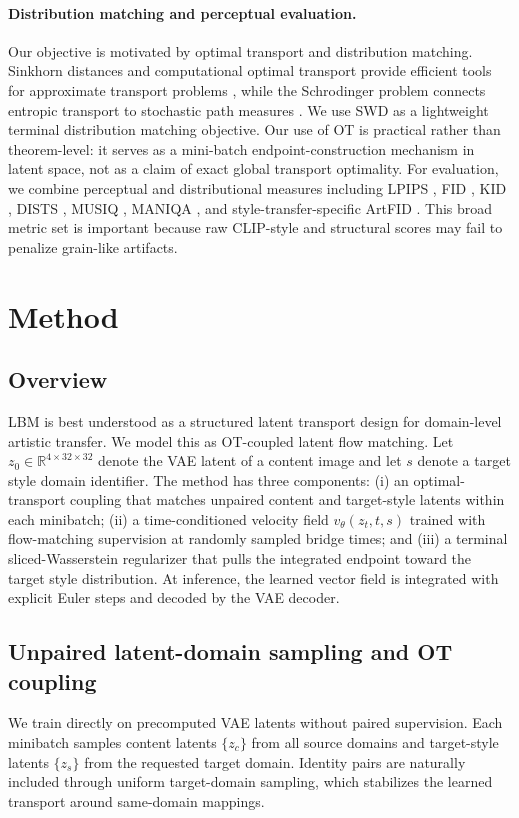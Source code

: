 ﻿\documentclass[letterpaper]{article}
\begin{document}
\paragraph{Distribution matching and perceptual evaluation.}
Our objective is motivated by optimal transport and distribution matching. Sinkhorn distances and computational optimal transport provide efficient tools for approximate transport problems \cite{cuturi2013sinkhorn,peyre2019computational}, while the Schrodinger problem connects entropic transport to stochastic path measures \cite{leonard2014survey}. We use SWD as a lightweight terminal distribution matching objective. Our use of OT is practical rather than theorem-level: it serves as a mini-batch endpoint-construction mechanism in latent space, not as a claim of exact global transport optimality. For evaluation, we combine perceptual and distributional measures including LPIPS \cite{zhang2018lpips}, FID \cite{heusel2017fid}, KID \cite{binkowski2018kid}, DISTS \cite{ding2020dists}, MUSIQ \cite{ke2021musiq}, MANIQA \cite{yang2022maniqa}, and style-transfer-specific ArtFID \cite{wright2022artfid}. This broad metric set is important because raw CLIP-style and structural scores may fail to penalize grain-like artifacts.

\section{Method}
\subsection{Overview}
LBM is best understood as a structured latent transport design for domain-level artistic transfer. We model this as OT-coupled latent flow matching. Let $z_0 \in \mathbb{R}^{4 \times 32 \times 32}$ denote the VAE latent of a content image and let $s$ denote a target style domain identifier. The method has three components: (i) an optimal-transport coupling that matches unpaired content and target-style latents within each minibatch; (ii) a time-conditioned velocity field $v_\theta(z_t,t,s)$ trained with flow-matching supervision at randomly sampled bridge times; and (iii) a terminal sliced-Wasserstein regularizer that pulls the integrated endpoint toward the target style distribution. At inference, the learned vector field is integrated with explicit Euler steps and decoded by the VAE decoder.

\subsection{Unpaired latent-domain sampling and OT coupling}
We train directly on precomputed VAE latents without paired supervision. Each minibatch samples content latents $\{z_c\}$ from all source domains and target-style latents $\{z_s\}$ from the requested target domain. Identity pairs are naturally included through uniform target-domain sampling, which stabilizes the learned transport around same-domain mappings.
\end{document}
